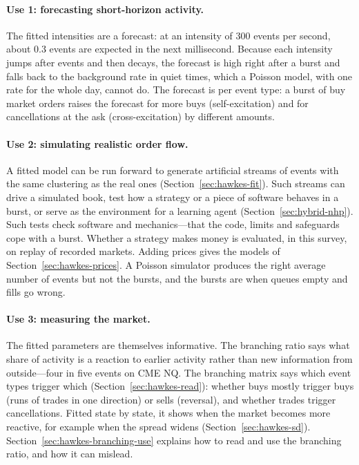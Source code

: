 \paragraph{Use 1: forecasting short-horizon activity.}
The fitted intensities are a forecast: at an intensity of 300 events per second, about 0.3 events are expected in
the next millisecond. Because each intensity jumps after events and then decays, the forecast is high right after a
burst and falls back to the background rate in quiet times, which a Poisson model, with one rate for the whole
day, cannot do. The forecast is per event type: a burst of buy market orders raises the forecast for more buys
(self-excitation) and for cancellations at the ask (cross-excitation) by different amounts.

\paragraph{Use 2: simulating realistic order flow.}
A fitted model can be run forward to generate artificial streams of events with the same clustering as the real
ones (Section~\ref{sec:hawkes-fit}). Such streams can drive a simulated book, test how a strategy or a piece of
software behaves in a burst, or serve as the environment for a learning agent (Section~\ref{sec:hybrid-nhp}).
Such tests check software and mechanics---that the code, limits and safeguards cope with a burst. Whether a
strategy makes money is evaluated, in this survey, on replay of recorded markets.
Adding prices gives the models of Section~\ref{sec:hawkes-prices}. A Poisson simulator produces the right average
number of events but not the bursts, and the bursts are when queues empty and fills go wrong.

\paragraph{Use 3: measuring the market.}
The fitted parameters are themselves informative. The branching ratio says what share of activity is a reaction to
earlier activity rather than new information from outside---four in five events on CME NQ. The branching matrix
says which event types trigger which (Section~\ref{sec:hawkes-read}): whether buys mostly trigger buys (runs of
trades in one direction) or sells (reversal), and whether trades trigger cancellations. Fitted state by state, it
shows when the market becomes more reactive, for example when the spread widens
(Section~\ref{sec:hawkes-sd}). Section~\ref{sec:hawkes-branching-use} explains how to read and use the branching
ratio, and how it can mislead.

